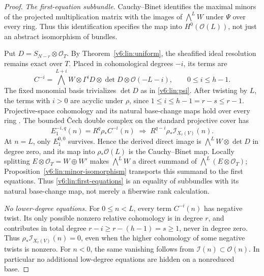 \documentclass[10pt,fleqn]{article}
\numberwithin{equation}{section}
\begin{document}
\begin{proof}
\emph{The first-equation subbundle.} Cauchy--Binet identifies the maximal minors of the projected
multiplication matrix with the images of $\bigwedge^L W$ under $\Psi$
over every ring.  Thus this identification specifies the map into
$H^0(\mathcal O(L))$, not just an abstract isomorphism of bundles.

Put $D=S_{N-r}\otimes\mathcal O_T$.  By Theorem~\ref{v6:lin:uniform},
the sheafified ideal resolution remains exact over $T$.  Placed in
cohomological degrees $-i$, its terms are
\[
 C^{-i}=\bigwedge^{L+i}W\otimes\Gamma^i D\otimes\det D
                \otimes\mathcal O(-L-i),\qquad 0\le i\le h-1.
\]
The fixed monomial basis trivializes $\det D$ as in
\eqref{v6:lin:psi}.  After twisting by $L$, the terms with $i>0$ are
acyclic under $\rho$, since $1\le i\le h-1=r-s\le r-1$.
Projective-space cohomology and its natural base-change maps hold over
every ring \cite[Tags~01XT, 01XV, 01XW]{Stacks}.
The bounded \v Cech double complex on the standard projective cover has
\[
 E_1^{-i,q}(n)=R^q\rho_*C^{-i}(n)
 \;\Longrightarrow\;R^{q-i}\rho_*\mathcal I_{X_r(V)}(n).
\]
At $n=L$, only $E_1^{0,0}$ survives.  Hence the derived direct image is
$\bigwedge^L W\otimes\det D$ in degree zero, and its map into
$\rho_*\mathcal O(L)$ is the Cauchy--Binet map.
Locally splitting $E\otimes\mathcal O_T=W\oplus W'$ makes
$\bigwedge^L W$ a direct summand of $\bigwedge^L(E\otimes\mathcal O_T)$;
Proposition~\ref{v6:lin:minor-isomorphism} transports this summand to
the first equations.  Thus \eqref{v6:lin:first-equations} is an equality
of subbundles with its natural base-change map, not merely a fiberwise
rank calculation.

\emph{No lower-degree equations.} For $0\le n<L$, every term $C^{-i}(n)$ has negative twist.  Its only
possible nonzero relative cohomology is in degree $r$, and contributes
in total degree $r-i\ge r-(h-1)=s\ge1$, never in degree zero.
Thus $\rho_*\mathcal I_{X_r(V)}(n)=0$, even when the higher cohomology
of some negative twists is nonzero.  For $n<0$, the same vanishing
follows from $\mathcal I(n)\subset\mathcal O(n)$.  In particular no
additional low-degree equations are hidden on a nonreduced base.


\end{proof}
\end{document}

